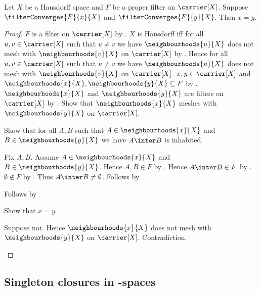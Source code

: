 \begin{theorem}\label{hausdorff_proper_filter_limit_unique}
    Let $X$ be a Hausdorff space and
        $F$ be a proper filter on $\carrier[X]$.
    Suppose $\filterConverges{F}{x}{X}$ and
        $\filterConverges{F}{y}{X}$.
    Then $x=y$.
\end{theorem}
\begin{proof}
    $F$ is a filter on $\carrier[X]$ by .
    $X$ is Hausdorff iff for all $u,v\in\carrier[X]$ such that
        $u\neq v$ we have $\neighbourhoods{u}{X}$ does not mesh with
        $\neighbourhoods{v}{X}$ on $\carrier[X]$ by
        .
    Hence for all $u,v\in\carrier[X]$ such that $u\neq v$ we have
        $\neighbourhoods{u}{X}$ does not mesh with
        $\neighbourhoods{v}{X}$ on $\carrier[X]$.
    $x,y\in\carrier[X]$ and
        $\neighbourhoods{x}{X},\neighbourhoods{y}{X}\subseteq F$ by
        .
    $\neighbourhoods{x}{X}$ and $\neighbourhoods{y}{X}$ are filters on
        $\carrier[X]$ by .
    Show that $\neighbourhoods{x}{X}$ meshes with
        $\neighbourhoods{y}{X}$ on $\carrier[X]$.
    \begin{subproof}
        Show that for all $A,B$ such that
            $A\in\neighbourhoods{x}{X}$ and
            $B\in\neighbourhoods{y}{X}$ we have
            $A\inter B$ is inhabited.
        \begin{subproof}
            Fix $A,B$.
            Assume $A\in\neighbourhoods{x}{X}$ and
                $B\in\neighbourhoods{y}{X}$.
            Hence $A,B\in F$ by .
            Hence $A\inter B\in F$ by .
            $\emptyset\notin F$ by .
            Thus $A\inter B\neq\emptyset$.
            Follows by .
        \end{subproof}
        Follows by .
    \end{subproof}
    Show that $x=y$.
    \begin{subproof}
        Suppose not.
        Hence $\neighbourhoods{x}{X}$ does not mesh with
            $\neighbourhoods{y}{X}$ on $\carrier[X]$.
        Contradiction.
    \end{subproof}
\end{proof}

\subsection{Singleton closures in \teeone-spaces}

